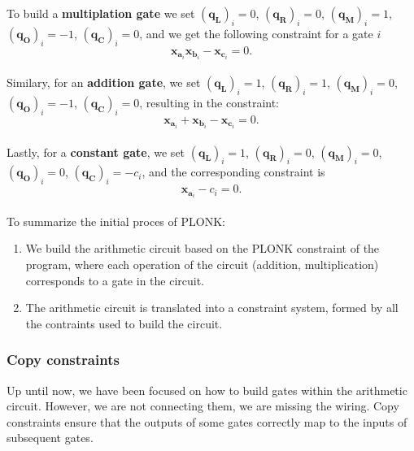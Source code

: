 To build a \textbf{multiplation gate} we set $\left(\textbf{q}_\textbf{L}\right)_i=0$, $\left(\textbf{q}_\textbf{R}\right)_i=0$, $\left(\textbf{q}_\textbf{M}\right)_i=1$, $\left(\textbf{q}_\textbf{O}\right)_i=-1$, $\left(\textbf{q}_\textbf{C}\right)_i=0$, and we get the following constraint for a gate $i$
\[\textbf{x}_{\textbf{a}_i}\textbf{x}_{\textbf{b}_i}-\textbf{x}_{\textbf{c}_i}=0.\]\\
Similary, for an \textbf{addition gate}, we set $\left(\textbf{q}_\textbf{L}\right)_i=1$, $\left(\textbf{q}_\textbf{R}\right)_i=1$, $\left(\textbf{q}_\textbf{M}\right)_i=0$, $\left(\textbf{q}_\textbf{O}\right)_i=-1$, $\left(\textbf{q}_\textbf{C}\right)_i=0$, resulting in the constraint:
\[\textbf{x}_{\textbf{a}_i}+\textbf{x}_{\textbf{b}_i}-\textbf{x}_{\textbf{c}_i}=0.\]\\
Lastly, for a \textbf{constant gate}, we set $\left(\textbf{q}_\textbf{L}\right)_i=1$, $\left(\textbf{q}_\textbf{R}\right)_i=0$, $\left(\textbf{q}_\textbf{M}\right)_i=0$, $\left(\textbf{q}_\textbf{O}\right)_i=0$, $\left(\textbf{q}_\textbf{C}\right)_i=-c_i$, and the corresponding constraint is
\[\textbf{x}_{\textbf{a}_i}-c_i=0.\]\\
To summarize the initial proces of PLONK: 
\begin{enumerate}
    \item We build the arithmetic circuit based on the PLONK constraint of the program, where each operation of the circuit (addition, multiplication) corresponds to a gate in the circuit.
    \item The arithmetic circuit is translated into a constraint system, formed by all the contraints used to build the circuit.
\end{enumerate}

\subsubsection*{Copy constraints}
Up until now, we have been focused on how to build gates within the arithmetic circuit. However, we are not connecting them, we are missing the wiring. Copy constraints ensure that the outputs of some gates correctly map to the inputs of subsequent gates.

